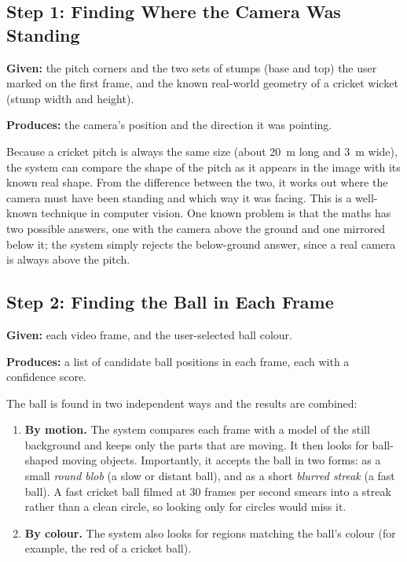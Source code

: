 \documentclass[12pt,a4paper]{report}
\begin{document}
\subsection{Step 1: Finding Where the Camera Was Standing}

\textbf{Given:} the pitch corners and the two sets of stumps (base and top) the user marked on the first frame, and the known real-world geometry of a cricket wicket (stump width and height).

\textbf{Produces:} the camera's position and the direction it was pointing.

Because a cricket pitch is always the same size (about 20~m long and 3~m wide), the system can compare the shape of the pitch as it appears in the image with its known real shape. From the difference between the two, it works out where the camera must have been standing and which way it was facing. This is a well-known technique in computer vision. One known problem is that the maths has two possible answers, one with the camera above the ground and one mirrored below it; the system simply rejects the below-ground answer, since a real camera is always above the pitch.

\subsection{Step 2: Finding the Ball in Each Frame}

\textbf{Given:} each video frame, and the user-selected ball colour.

\textbf{Produces:} a list of candidate ball positions in each frame, each with a confidence score.

The ball is found in two independent ways and the results are combined:

\begin{enumerate}
    \item \textbf{By motion.} The system compares each frame with a model of the still background and keeps only the parts that are moving. It then looks for ball-shaped moving objects. Importantly, it accepts the ball in two forms: as a small \emph{round blob} (a slow or distant ball), and as a short \emph{blurred streak} (a fast ball). A fast cricket ball filmed at 30 frames per second smears into a streak rather than a clean circle, so looking only for circles would miss it.
    \item \textbf{By colour.} The system also looks for regions matching the ball's colour (for example, the red of a cricket ball).
\end{enumerate}
\end{document}
